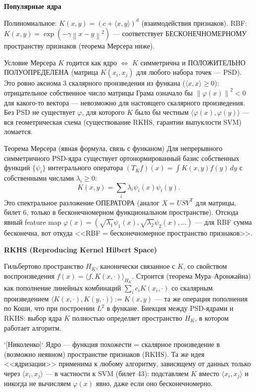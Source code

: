 \documentclass[12pt, a4paper]{article}
\newcommand{\qsub}[1]{%
  \vspace{5pt}%
  {\bfseries\color{defblue} #1}%
  \par\vspace{2pt}%
}
\newcommand{\tr}{^{\mathsf{T}}}
\newcommand{\norm}[1]{\left\lVert #1 \right\rVert}
\begin{document}
\qsub{Популярные ядра}
Полиномиальное: $K(x,y)=(c+\langle x,y\rangle)^d$ (взаимодействия признаков). RBF: $K(x,y)=\exp(-\gamma\norm{x-y}^2)$ --- соответствует БЕСКОНЕЧНОМЕРНОМУ пространству признаков (теорема Мерсера ниже).

\begin{thmbox}{Условие Мерсера}
$K$ годится как ядро $\Leftrightarrow$ $K$ симметрична и ПОЛОЖИТЕЛЬНО ПОЛУОПРЕДЕЛЕНА (матрица $K(x_i,x_j)$ для любого набора точек --- PSD). Это ровно аксиома 3 скалярного произведения из функана ($\langle x,x\rangle\ge0$): отрицательное собственное число матрицы Грама означало бы $\norm{\varphi(x)}^2<0$ для какого-то вектора --- невозможно для настоящего скалярного произведения. Без PSD не существует $\varphi$, для которого $K$ было бы честным $\langle\varphi(x),\varphi(y)\rangle$ --- вся геометрическая схема (существование RKHS, гарантии выпуклости SVM) ломается.
\end{thmbox}

\begin{propbox}{Теорема Мерсера (явная формула, связь с функаном)}
Для непрерывного симметричного PSD-ядра существует ортонормированный базис собственных функций $\{\psi_i\}$ интегрального оператора $(T_K f)(x) = \int K(x,y)f(y)\,dy$ с собственными числами $\lambda_i \ge 0$:
\[
  K(x,y) = \sum_i \lambda_i \psi_i(x)\psi_i(y).
\]
Это спектральное разложение ОПЕРАТОРА (аналог $X=USV\tr$ для матрицы, билет 6, только в бесконечномерном функциональном пространстве). Отсюда явный feature map $\varphi(x) = (\sqrt{\lambda_1}\psi_1(x), \sqrt{\lambda_2}\psi_2(x), \dots)$ --- для RBF сумма бесконечна, вот откуда <<RBF = бесконечномерное пространство признаков>>.
\end{propbox}

\qsub{RKHS (Reproducing Kernel Hilbert Space)}
Гильбертово пространство $H_K$, канонически связанное с $K$, со свойством воспроизведения $f(x) = \langle f, K(x,\cdot)\rangle_{H_K}$. Строится (теорема Мура--Аронжайна) как пополнение линейных комбинаций $\sum_i c_i K(x_i,\cdot)$ со скалярным произведением $\langle K(x,\cdot),K(y,\cdot)\rangle := K(x,y)$ --- та же операция пополнения по Коши, что при построении $L^2$ в функане. Биекция между PSD-ядрами и RKHS: выбор ядра $K$ полностью определяет пространство $H_K$, в котором работает алгоритм.

\begin{fishkabox}
`[Николенко]` Ядро --- функция похожести = скалярное произведение в (возможно неявном) пространстве признаков (RKHS). Та же идея <<ядризации>> применима к любому алгоритму, зависящему от данных только через $\langle x_i,x_j\rangle$ --- в частности к SVM (билет 43): подставляем $K$ вместо $\langle x_i,x_j\rangle$ и никогда не вычисляем $\varphi(x)$ явно, даже если оно бесконечномерно.
\end{fishkabox}
\end{document}
